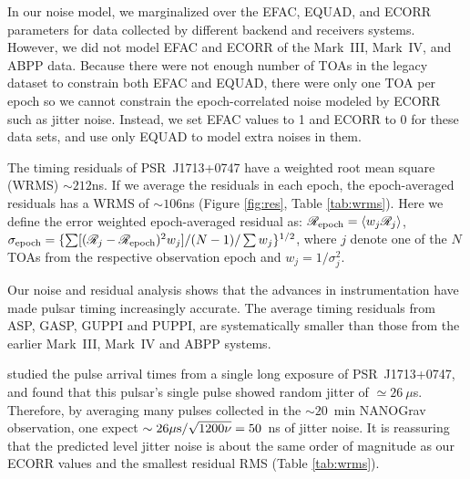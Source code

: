 {In our noise model, we marginalized over the EFAC, EQUAD, and ECORR parameters
for data collected by different backend and receivers systems. However, we did not model 
EFAC and ECORR of the Mark~III, Mark~IV, and ABPP data. Because there were not
enough number of TOAs in the legacy dataset to constrain both EFAC and EQUAD,
there were only one TOA per epoch so we cannot constrain the epoch-correlated
noise modeled by ECORR such as jitter noise. Instead, we set EFAC values to 1
and ECORR to 0 for these data sets, and use only EQUAD to model extra noises
in them.


The timing residuals of PSR~J1713+0747 have a weighted root mean square (WRMS)
$\sim 212$ns.
If we average the residuals in each epoch, the epoch-averaged residuals has a 
WRMS of $\sim 106$ns (Figure \ref{fig:res}, Table \ref{tab:wrms}).
Here we define the error weighted epoch-averaged residual as: 
$\mathscr{R}_{\rm epoch} = \langle w_j\mathscr{R}_{j}\rangle$, $\sigma_{\rm
epoch}=\{\sum [(\mathscr{R}_j-\mathscr{R}_{\rm epoch})^2w_j]/(N-1)/\sum w_j\}^{1/2}$, where $j$
denote one of the $N$ TOAs from the respective observation epoch and
$w_j=1/\sigma_j^2$.

Our noise and residual analysis shows that the advances in
instrumentation have made pulsar timing increasingly accurate.
The average timing residuals from ASP, GASP, GUPPI and PUPPI, are
systematically smaller than those from the earlier Mark~III, Mark~IV and ABPP
systems.

\citet{sc12} studied the pulse arrival times from a single long exposure of
PSR~J1713+0747, and found that this pulsar's single pulse showed random jitter of
$\simeq26~\mu$s. Therefore, by averaging many pulses collected in the
$\sim20$~min NANOGrav observation, one expect $\sim26\mu{\rm s}/\sqrt{1200\nu}=50$~ns of jitter noise. 
It is reassuring that the predicted level jitter noise is about the same order
of magnitude as our ECORR values and the smallest residual RMS (Table \ref{tab:wrms}). 

}


